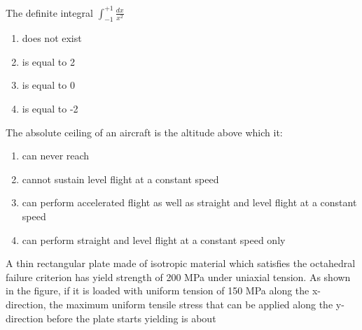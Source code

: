 \item The definite integral $\int_{-1}^{+1}\frac{dx}{x^{2}}$
\begin{multicols}{4}
    \begin{enumerate}
    \item does not exist
    \item is equal to 2
    \item is equal to 0
    \item is equal to -2
    \end{enumerate}
    \end{multicols}
    
\item The absolute ceiling of an aircraft is the altitude above which it:
    \begin{enumerate}
    \item can never reach
    \item cannot sustain level flight at a constant speed
    \item can perform accelerated flight as well as straight and level flight at a constant speed
    \item can perform straight and level flight at a constant speed only
    \end{enumerate}

\item A thin rectangular plate made of isotropic material which satisfies the octahedral  failure criterion has yield strength of 200 MPa under uniaxial tension. As shown in the figure, if it is loaded with uniform tension of 150 MPa along the x-direction, the maximum uniform tensile stress that can be applied along the y-direction before the plate starts yielding is about

